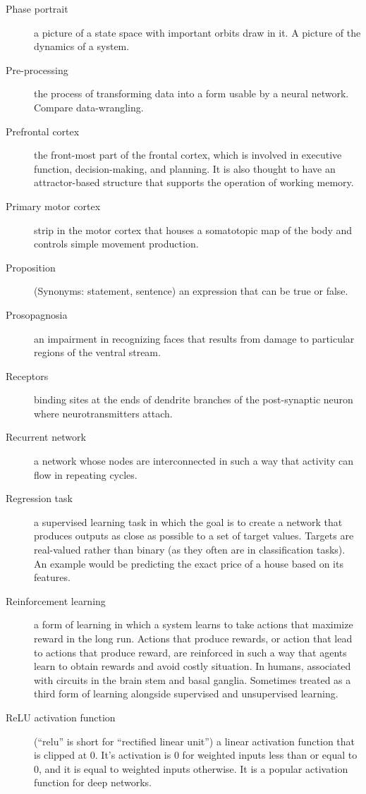 \begin{description}
\item[Phase portrait] a picture of a state space with important orbits draw in it. A picture of the dynamics of a system.
\item[Pre-processing] the process of transforming data into a form usable by a neural network. Compare data-wrangling.
\item[Prefrontal cortex] the front-most part of the frontal cortex, which is involved in executive function, decision-making, and planning. It is also thought to have an attractor-based structure that supports the operation of working memory.
\item[Primary motor cortex] strip in the motor cortex that houses a somatotopic map of the body and controls simple movement production. 
\item[Proposition]  (Synonyms: statement, sentence) an expression that can be true or false.
\item[Prosopagnosia] an impairment in recognizing faces that results from damage to particular regions of the ventral stream.
\item[Receptors] binding sites at the ends of dendrite branches of the post-synaptic neuron where neurotransmitters attach.
\item[Recurrent network] a network whose nodes are interconnected in such a way that activity can flow in repeating cycles.
\item[Regression task] a supervised learning task in which the goal is to create a network that produces outputs as close as possible to a set of target values. Targets are real-valued rather than binary (as they often are in classification tasks). An example would be predicting the exact price of a house based on its features.
\item[Reinforcement learning] a form of learning in which a system learns to take actions that maximize reward in the long run.   Actions that produce rewards, or action that lead to actions that produce reward, are reinforced in such a way that agents learn to obtain rewards and avoid costly situation.  In humans, associated with circuits in the brain stem and basal ganglia.  Sometimes treated as a third form of learning alongside supervised and unsupervised learning.
\item[ReLU activation function] (``relu'' is short for ``rectified linear unit'') a linear activation function that is clipped at  0. It's activation is 0 for weighted inputs less than or equal to 0, and it is equal to weighted inputs otherwise. It is a popular activation function for deep networks.

\end{description}
